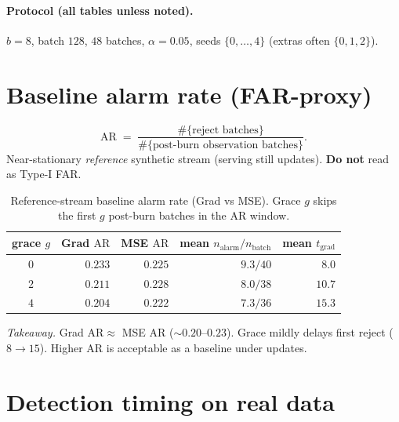 \documentclass[11pt]{article}
\newcommand{\AR}{\mathrm{AR}}
\begin{document}
\paragraph{Protocol (all tables unless noted).}
$b{=}8$, batch $128$, $48$ batches, $\alpha{=}0.05$,
seeds $\{0,\ldots,4\}$ (extras often $\{0,1,2\}$).

\section{Baseline alarm rate (FAR-proxy)}
\label{sec:ar}

\begin{equation}
\label{eq:AR}
  \AR
  \;=\;
  \frac{\#\{\text{reject batches}\}}{\#\{\text{post-burn observation batches}\}}.
\end{equation}
Near-stationary \emph{reference} synthetic stream (serving still
updates). \textbf{Do not} read as Type-I FAR.

\begin{table}[h]
\centering
\caption{Reference-stream baseline alarm rate (Grad vs MSE).
Grace $g$ skips the first $g$ post-burn batches in the AR window.}
\label{tab:ar}
\begin{tabular}{crrrr}
\toprule
grace $g$ & Grad $\AR$ & MSE $\AR$ & mean $n_{\mathrm{alarm}}/n_{\mathrm{batch}}$ & mean $t_{\mathrm{grad}}$ \\
\midrule
$0$ & $0.233$ & $0.225$ & $9.3/40$ & $8.0$ \\
$2$ & $0.211$ & $0.228$ & $8.0/38$ & $10.7$ \\
$4$ & $0.204$ & $0.222$ & $7.3/36$ & $15.3$ \\
\bottomrule
\end{tabular}
\end{table}

\noindent\textit{Takeaway.} Grad $\AR\approx$ MSE $\AR$
($\sim 0.20$--$0.23$). Grace mildly delays first reject
($8\to 15$). Higher AR is acceptable as a baseline under updates.

\section{Detection timing on real data}
\label{sec:delay}
\end{document}
